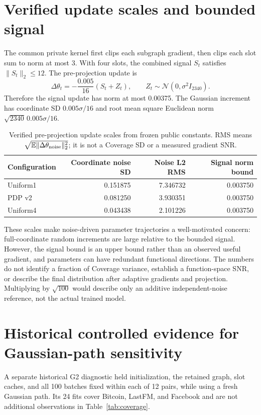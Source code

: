 \section{Verified update scales and bounded signal}
The common private kernel first clips each subgraph gradient, then clips each slot sum to norm at most 3. With four slots, the combined signal $S_t$ satisfies $\|S_t\|_2\leq12$. The pre-projection update is
\begin{equation}
 \Delta\theta_t=-\frac{0.005}{16}(S_t+Z_t),\qquad
 Z_t\sim\mathcal N(0,\sigma^2I_{2340}).
\end{equation}
Therefore the signal update has norm at most 0.00375. The Gaussian increment has coordinate SD $0.005\sigma/16$ and root mean square Euclidean norm $\sqrt{2340}\,0.005\sigma/16$.

\begin{table}[htbp]
\centering\small
\caption{Verified pre-projection update scales from frozen public constants. RMS means $\sqrt{\mathbb E\|\Delta\theta_{\rm noise}\|_2^2}$; it is not a Coverage SD or a measured gradient SNR.}\label{tab:noisescale}
\begin{tabular}{lrrr}\toprule
Configuration & Coordinate noise SD & Noise L2 RMS & Signal norm bound\\\midrule
Uniform1 & 0.151875 & 7.346732 & 0.003750\\
PDP v2 & 0.081250 & 3.930351 & 0.003750\\
Uniform4 & 0.043438 & 2.101226 & 0.003750\\\bottomrule
\end{tabular}
\end{table}

These scales make noise-driven parameter trajectories a well-motivated concern: full-coordinate random increments are large relative to the bounded signal. However, the signal bound is an upper bound rather than an observed useful gradient, and parameters can have redundant functional directions. The numbers do not identify a fraction of Coverage variance, establish a function-space SNR, or describe the final distribution after adaptive gradients and projection. Multiplying by $\sqrt{100}$ would describe only an additive independent-noise reference, not the actual trained model.

\section{Historical controlled evidence for Gaussian-path sensitivity}
A separate historical G2 diagnostic held initialization, the retained graph, slot caches, and all 100 batches fixed within each of 12 pairs, while using a fresh Gaussian path. Its 24 fits cover Bitcoin, LastFM, and Facebook and are not additional observations in Table~\ref{tab:coverage}.

